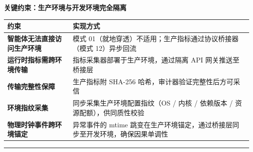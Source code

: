 \begin{itemize}
\begin{Shaded}
\begin{Highlighting}[]


\end{Highlighting}
\end{Shaded}
\end{itemize}

\textbf{关键约束：生产环境与开发环境完全隔离}

{\def\LTcaptype{} %
\begin{longtable}[]{@{}
  >{\raggedright\arraybackslash}p{}
  >{\raggedright\arraybackslash}p{}@{}}
\toprule\noalign{}
\begin{minipage}[b]{\linewidth}\raggedright
约束
\end{minipage} & \begin{minipage}[b]{\linewidth}\raggedright
实现方式
\end{minipage} \\
\midrule\noalign{}
\endhead
\bottomrule\noalign{}
\endlastfoot
\textbf{智能体无法直接访问生产环境} & 模式
01（就地穿透）不适用；生产指标通过协议桥接器（模式 12）异步回流 \\
\textbf{运行时指标需跨环境传输} & 指标采集器部署于生产环境，通过隔离 API
网关推送至桥接层 \\
\textbf{传输完整性保障} & 生产指标附 SHA-256
哈希，审计器验证完整性后方可采信 \\
\textbf{环境指纹采集} & 同步采集生产环境配置指纹（OS / 内核 / 依赖版本 /
资源配额），供同质性校验 \\
\textbf{物理时钟事件跨环境锚定} & 异常事件的 mtime
跳变在生产环境锚定，通过桥接层同步至开发环境，确保因果单调性 \\
\end{longtable}
}

\begin{center}\rule{0.5\linewidth}{0.5pt}\end{center}

